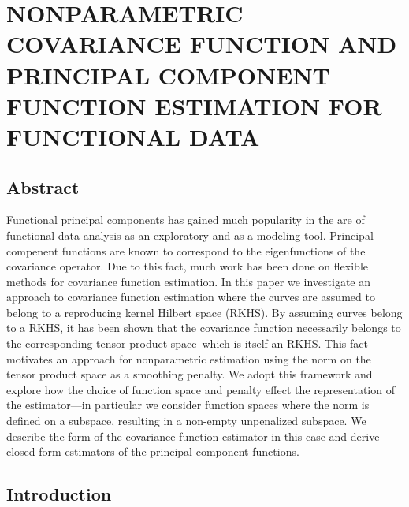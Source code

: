 

\chapter{NONPARAMETRIC COVARIANCE FUNCTION AND PRINCIPAL COMPONENT FUNCTION ESTIMATION FOR FUNCTIONAL DATA} \label{ch:covariance estimation}

\section{Abstract} 

\label{sec:abstract}

Functional principal components has gained much popularity in the are of functional data analysis as an exploratory and as a modeling tool. Principal compenent functions are known to correspond to the eigenfunctions of the covariance operator. Due to this fact, much work has been done on flexible methods for covariance function estimation. In this paper we investigate an approach to covariance function estimation where the curves are assumed to belong to a reproducing kernel Hilbert space (RKHS). By assuming curves belong to a RKHS, it has been shown that the covariance function necessarily belongs to the corresponding tensor product space--which is itself an RKHS. This fact motivates an approach for nonparametric estimation using the norm on the tensor product space as a smoothing penalty. We adopt this framework and explore how the choice of function space and penalty effect the representation of the estimator---in particular we consider function spaces where the norm is defined on a subspace, resulting in a non-empty unpenalized subspace. We describe the form of the covariance function estimator in this case and derive closed form estimators of the principal component functions. 

\section{Introduction} 

\label{sec:introduction}

